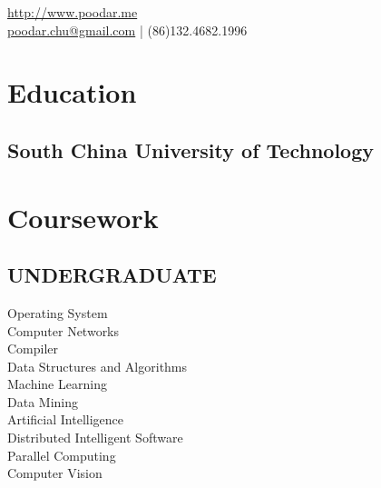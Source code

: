 \documentclass[]{deedy-resume-openfont}
\begin{document}
%
%
\lastupdated

%
%


 { %
	\url{http://www.poodar.me} \\
	\href{mailto:poodarchu@gmail.com}{poodar.chu@gmail.com} | (86)132.4682.1996 %
}

%
%

\begin{minipage}[t]{0.30\textwidth} 


\section{Education} 

\subsection{South China University of Technology}

\sectionsep


\section{Coursework}

\subsection{UNDERGRADUATE}
Operating System \\
Computer Networks \\
Compiler \\
Data Structures and Algorithms \\
Machine Learning \\
Data Mining \\
Artificial Intelligence\\
Distributed Intelligent Software \\
Parallel Computing \\
Computer Vision


\end{minipage}
\end{document}

